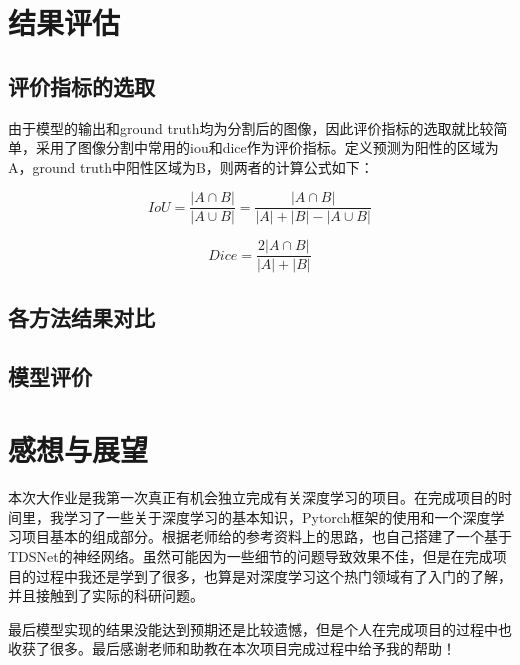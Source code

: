\documentclass[UTF8]{ctexart}
\begin{document}
\section{结果评估}
\subsection{评价指标的选取}
由于模型的输出和ground truth均为分割后的图像，因此评价指标的选取就比较简单，采用了图像分割中常用的iou和dice作为评价指标。定义预测为阳性的区域为A，ground truth中阳性区域为B，则两者的计算公式如下：

\begin{equation}
    IoU=\frac{|A\cap B|}{|A\cup B|}=\frac{|A\cap B|}{|A|+|B|-|A\cup B|}
\end{equation}

\begin{equation}
    Dice=\frac{2|A\cap B|}{|A|+|B|}
\end{equation}

\subsection{各方法结果对比}


\subsection{模型评价}

\section{感想与展望}
本次大作业是我第一次真正有机会独立完成有关深度学习的项目。在完成项目的时间里，我学习了一些关于深度学习的基本知识，Pytorch框架的使用和一个深度学习项目基本的组成部分。根据老师给的参考资料上的思路，也自己搭建了一个基于TDSNet的神经网络。虽然可能因为一些细节的问题导致效果不佳，但是在完成项目的过程中我还是学到了很多，也算是对深度学习这个热门领域有了入门的了解，并且接触到了实际的科研问题。

最后模型实现的结果没能达到预期还是比较遗憾，但是个人在完成项目的过程中也收获了很多。最后感谢老师和助教在本次项目完成过程中给予我的帮助！
\end{document}
